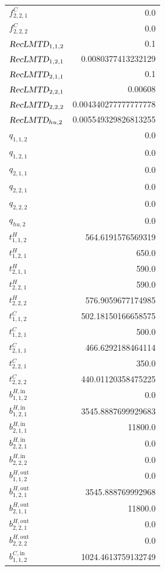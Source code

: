 \documentclass{article}%
\begin{document}
\begin{multicols*}{3}
\begin{supertabular}{lr}
	$f_{2,2,1}^{C}$ & 0.0 \\%
	$f_{2,2,2}^{C}$ & 0.0 \\%
	$\textsl{RecLMTD}_{1,1,2}$ & 0.1 \\%
	$\textsl{RecLMTD}_{1,2,1}$ & 0.0080377413232129 \\%
	$\textsl{RecLMTD}_{2,1,1}$ & 0.1 \\%
	$\textsl{RecLMTD}_{2,2,1}$ & 0.00608 \\%
	$\textsl{RecLMTD}_{2,2,2}$ & 0.004340277777777778 \\%
	$\textsl{RecLMTD}_{hu,2}$ & 0.005549329826813255 \\%
	$q_{1,1,2}$ & 0.0 \\%
	$q_{1,2,1}$ & 0.0 \\%
	$q_{2,1,1}$ & 0.0 \\%
	$q_{2,2,1}$ & 0.0 \\%
	$q_{2,2,2}$ & 0.0 \\%
	$q_{hu,2}$ & 0.0 \\%
	$t_{1,1,2}^{H}$ & 564.6191576569319 \\%
	$t_{1,2,1}^{H}$ & 650.0 \\%
	$t_{2,1,1}^{H}$ & 590.0 \\%
	$t_{2,2,1}^{H}$ & 590.0 \\%
	$t_{2,2,2}^{H}$ & 576.9059677174985 \\%
	$t_{1,1,2}^{C}$ & 502.18150166658575 \\%
	$t_{1,2,1}^{C}$ & 500.0 \\%
	$t_{2,1,1}^{C}$ & 466.6292188464114 \\%
	$t_{2,2,1}^{C}$ & 350.0 \\%
	$t_{2,2,2}^{C}$ & 440.01120358475225 \\%
	$b_{1,1,2}^{H,\text{in}}$ & 0.0 \\%
	$b_{1,2,1}^{H,\text{in}}$ & 3545.8887699929683 \\%
	$b_{2,1,1}^{H,\text{in}}$ & 11800.0 \\%
	$b_{2,2,1}^{H,\text{in}}$ & 0.0 \\%
	$b_{2,2,2}^{H,\text{in}}$ & 0.0 \\%
	$b_{1,1,2}^{H,\text{out}}$ & 0.0 \\%
	$b_{1,2,1}^{H,\text{out}}$ & 3545.888769992968 \\%
	$b_{2,1,1}^{H,\text{out}}$ & 11800.0 \\%
	$b_{2,2,1}^{H,\text{out}}$ & 0.0 \\%
	$b_{2,2,2}^{H,\text{out}}$ & 0.0 \\%
	$b_{1,1,2}^{C,\text{in}}$ & 1024.4613759132749 \\%

\end{supertabular}
\end{multicols*}
\end{document}

